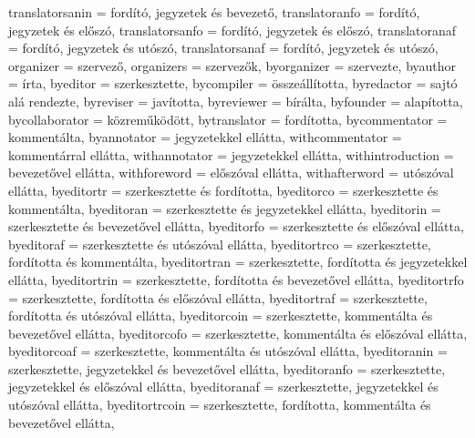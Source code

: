 {		translatorsanin  = {ford\'it\'o, jegyzetek \'es bevezet\H{o}},
		translatoranfo   = {ford\'it\'o, jegyzetek \'es el\H{o}sz\'o},
		translatorsanfo  = {ford\'it\'o, jegyzetek \'es el\H{o}sz\'o},
		translatoranaf   = {ford\'it\'o, jegyzetek \'es ut\'osz\'o},
		translatorsanaf  = {ford\'it\'o, jegyzetek \'es ut\'osz\'o},
		organizer        = {szervez\H{o}},
		organizers       = {szervez\H{o}k},
		byorganizer      = {szervezte},
		byauthor         = {\'irta},
		byeditor         = {szerkesztette},
		bycompiler       = {\"ossze\'all\'itotta},
		byredactor       = {sajt\'o al\'a rendezte},
		byreviser        = {jav\'itotta},
		byreviewer       = {b\'ir\'alta},
		byfounder        = {alap\'itotta},
		bycollaborator   = {k\"ozrem\H{u}k\"od\"ott},
		bytranslator     = {\lbx@lfromlang ford\'itotta},
		bycommentator    = {komment\'alta},
		byannotator      = {jegyzetekkel ell\'atta},
		withcommentator  = {komment\'arral ell\'atta},
		withannotator    = {jegyzetekkel ell\'atta},
		withintroduction = {bevezet\H{o}vel ell\'atta},
		withforeword     = {el\H{o}sz\'oval ell\'atta},
		withafterword    = {ut\'osz\'oval ell\'atta},
		byeditortr       = {szerkesztette \'es \lbx@lfromlang ford\'itotta},
		byeditorco       = {szerkesztette \'es komment\'alta},
		byeditoran       = {szerkesztette \'es jegyzetekkel ell\'atta},
		byeditorin       = {szerkesztette \'es bevezet\H{o}vel ell\'atta},
		byeditorfo       = {szerkesztette \'es el\H{o}sz\'oval ell\'atta},
		byeditoraf       = {szerkesztette \'es ut\'osz\'oval ell\'atta},
		byeditortrco     = {szerkesztette, \lbx@lfromlang ford\'itotta \'es komment\'alta},
		byeditortran     = {szerkesztette, \lbx@lfromlang ford\'itotta \'es jegyzetekkel ell\'atta},
		byeditortrin     = {szerkesztette, \lbx@lfromlang ford\'itotta \'es bevezet\H{o}vel ell\'atta},
		byeditortrfo     = {szerkesztette, \lbx@lfromlang ford\'itotta \'es el\H{o}sz\'oval ell\'atta},
		byeditortraf     = {szerkesztette, \lbx@lfromlang ford\'itotta \'es ut\'osz\'oval ell\'atta},
		byeditorcoin     = {szerkesztette, komment\'alta \'es bevezet\H{o}vel ell\'atta},
		byeditorcofo     = {szerkesztette, komment\'alta \'es el\H{o}sz\'oval ell\'atta},
		byeditorcoaf     = {szerkesztette, komment\'alta \'es ut\'osz\'oval ell\'atta},
		byeditoranin     = {szerkesztette, jegyzetekkel \'es bevezet\H{o}vel ell\'atta},
		byeditoranfo     = {szerkesztette, jegyzetekkel \'es el\H{o}sz\'oval ell\'atta},
		byeditoranaf     = {szerkesztette, jegyzetekkel \'es ut\'osz\'oval ell\'atta},
		byeditortrcoin   = {szerkesztette, \lbx@lfromlang ford\'itotta, komment\'alta \'es bevezet\H{o}vel ell\'atta},
}
